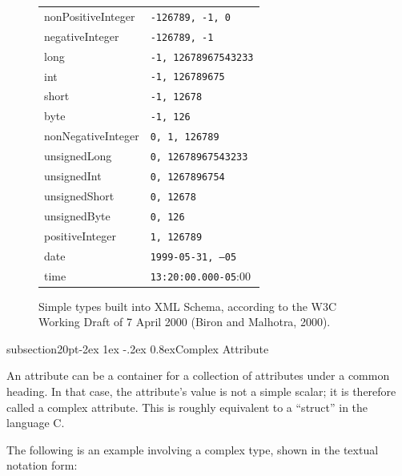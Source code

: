 \documentclass[10pt]{article}
\makeatletter
\renewcommand{\subsection}{\@startsection%
  {subsection}{2}{0pt}{-2ex \@plus 1ex \@minus -.2ex}%
  {0.8ex}{\slshape\large\bfseries}}
\makeatother
\begin{document}
\begin{figure}
\begin{tabular}{@{}ll@{}}
         nonPositiveInteger		& \texttt{-126789, -1, 0} \\
         negativeInteger		& \texttt{-126789, -1} \\
         long		& \texttt{-1, 12678967543233} \\
         int		& \texttt{-1, 126789675} \\
         short		& \texttt{-1, 12678} \\
         byte		& \texttt{-1, 126} \\
         nonNegativeInteger		& \texttt{0, 1, 126789} \\
         unsignedLong		& \texttt{0, 12678967543233} \\
         unsignedInt		& \texttt{0, 1267896754} \\
         unsignedShort		& \texttt{0, 12678} \\
         unsignedByte		& \texttt{0, 126} \\
         positiveInteger		& \texttt{1, 126789} \\
         date		& \texttt{1999-05-31, ---05} \\
         time		& \texttt{13:20:00.000-05}:00
  \end{tabular}
  \caption{Simple types built into XML Schema, according to the W3C Working
    Draft of 7 April 2000 (Biron and Malhotra, 2000).}
  \label{fig:simple-types}
\end{figure}


\subsection{Complex Attribute}
\label{sub:complex-attributes}

An attribute can be a container for a collection of attributes under a
common heading.  In that case, the attribute's value is not a simple
scalar; it is therefore called a complex attribute.  This is roughly
equivalent to a ``struct'' in the language C.

The following is an example involving a complex type, shown in the textual
notation form:
\end{document}
